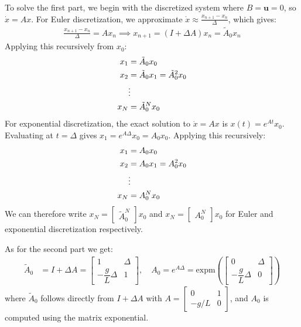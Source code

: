 \documentclass[12pt,twoside]{article}
\begin{document}
To solve the first part, we begin with the discretized system where $B = \mathbf{u} = 0$,
so $\dot{x} = Ax$. For Euler discretization, we approximate $\dot{x} \approx
\frac{x_{n+1} - x_n}{\Delta}$, which gives:
\begin{align}
    \frac{x_{n+1} - x_n}{\Delta} = Ax_n \implies x_{n+1} = (I + \Delta A)x_n = \tilde{A}_0 x_n
\end{align}
Applying this recursively from $x_0$:
\begin{align}
    x_1 &= \tilde{A}_0 x_0 \notag \\
    x_2 &= \tilde{A}_0 x_1 = \tilde{A}_0^2 x_0 \notag \\
    &\vdots \notag \\
    x_N &= \tilde{A}_0^N x_0
\end{align}
For exponential discretization, the exact solution to $\dot{x} = Ax$ is
$x(t) = e^{At}x_0$. Evaluating at $t = \Delta$ gives $x_1 = e^{A\Delta}x_0 = A_0 x_0$.
Applying this recursively:
\begin{align}
    x_1 &= A_0 x_0 \notag \\
    x_2 &= A_0 x_1 = A_0^2 x_0 \notag \\
    &\vdots \notag \\
    x_N &= A_0^N x_0
\end{align}
We can therefore write $x_N = \begin{bmatrix} \tilde{A}_0^N \end{bmatrix} x_0$ and
$x_N = \begin{bmatrix} A_0^N \end{bmatrix} x_0$ for Euler and exponential discretization
respectively.

As for the second part we get:
\begin{align}
\tilde A_0 & = I + \Delta A = \begin{bmatrix} 1 & \Delta \\ -\dfrac{g}{L}\Delta & 1 \end{bmatrix}, \quad A_0 = e^{A\Delta} = \text{expm}\!\left(\begin{bmatrix} 0 & \Delta \\ -\dfrac{g}{L}\Delta & 0 \end{bmatrix}\right)
\end{align}
where $\tilde{A}_0$ follows directly from $I + \Delta A$ with $A = \begin{bmatrix} 0 & 1
\\ -g/L & 0 \end{bmatrix}$, and $A_0$ is computed using the matrix exponential.
\end{document}
